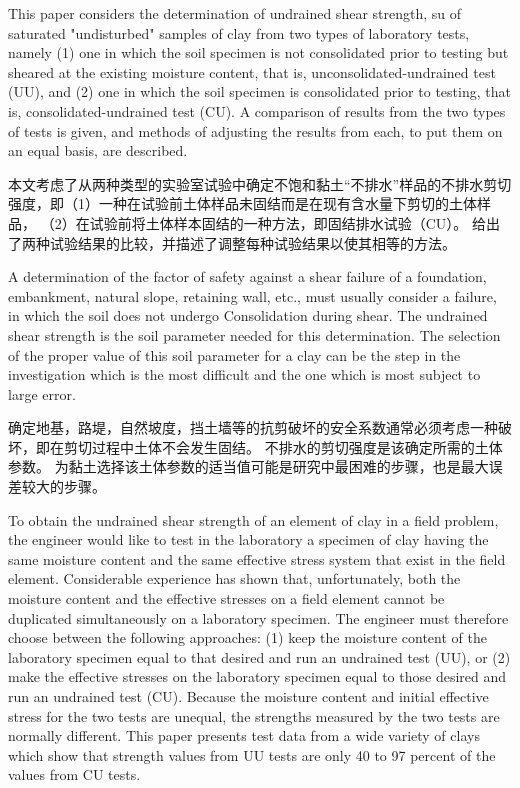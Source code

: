 \begin{paracol}{2}
    
    This paper considers the determination of undrained shear strength, su of saturated "undisturbed" samples of clay from two types of laboratory tests, namely (1) one in which the soil specimen is not consolidated prior to testing but sheared at the existing moisture content, that is, unconsolidated-undrained test (UU), and (2) one in which the soil specimen is consolidated prior to testing, that is, consolidated-undrained test (CU). A comparison of results from the two types of tests is given, and methods of adjusting the results from each, to put them on an equal basis, are described.

    \switchcolumn

    本文考虑了从两种类型的实验室试验中确定不饱和黏土“不排水”样品的不排水剪切强度，即（1）一种在试验前土体样品未固结而是在现有含水量下剪切的土体样品，  （2）在试验前将土体样本固结的一种方法，即固结排水试验（CU）。 给出了两种试验结果的比较，并描述了调整每种试验结果以使其相等的方法。

    \switchcolumn*

    A determination of the factor of safety against a shear failure of a foundation, embankment, natural slope, retaining wall, etc., must usually consider a failure, in which the soil does not undergo Consolidation during shear. The undrained shear strength is the soil parameter needed for this determination. The selection of the proper value of this soil parameter for a clay can be the step in the investigation which is the most difficult and the one which is most subject to large error. 

    \switchcolumn
   
    确定地基，路堤，自然坡度，挡土墙等的抗剪破坏的安全系数通常必须考虑一种破坏，即在剪切过程中土体不会发生固结。 不排水的剪切强度是该确定所需的土体参数。 为黏土选择该土体参数的适当值可能是研究中最困难的步骤，也是最大误差较大的步骤。

    \switchcolumn*

    To obtain the undrained shear strength of an element of clay in a field problem, the engineer would like to test in the laboratory a specimen of clay having the same moisture content and the same effective stress system that exist in the field element. Considerable experience has shown that, unfortunately, both the moisture content and the effective stresses on a field element cannot be duplicated simultaneously on a laboratory specimen. The engineer must therefore choose between the following approaches: (1) keep the moisture content of the laboratory specimen equal to that desired and run an undrained test (UU), or (2) make the effective stresses on the laboratory specimen equal to those desired and run an undrained test (CU). Because the moisture content and initial effective stress for the two tests are unequal, the strengths measured by the two tests are normally different. This paper presents test data from a wide variety of clays which show that strength values from UU tests are only 40 to 97 percent of the values from CU tests.


\end{paracol}
